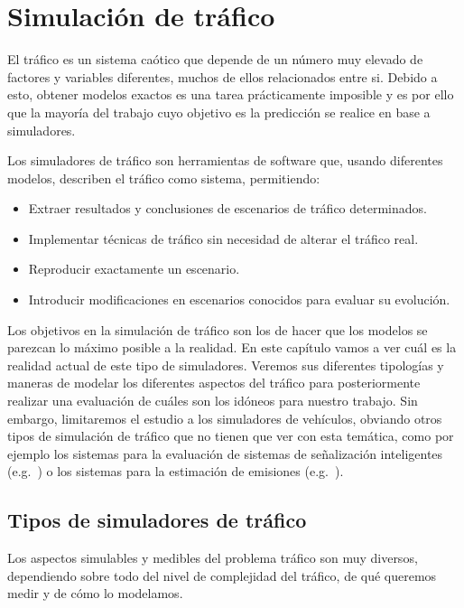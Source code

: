 \chapter{Simulación de tráfico}
\label{ch:sota-traffic-simulation}

El tráfico es un sistema caótico que depende de un número muy elevado de factores y variables diferentes, muchos de ellos relacionados entre si. Debido a esto, obtener modelos exactos es una tarea prácticamente imposible y es por ello que la mayoría del trabajo cuyo objetivo es la predicción se realice en base a simuladores.

Los simuladores de tráfico son herramientas de software que, usando diferentes modelos, describen el tráfico como sistema, permitiendo:

\begin{itemize}
	\item Extraer resultados y conclusiones de escenarios de tráfico determinados.
	\item Implementar técnicas de tráfico sin necesidad de alterar el tráfico real.
	\item Reproducir exactamente un escenario.
	\item Introducir modificaciones en escenarios conocidos para evaluar su evolución.
\end{itemize}

Los objetivos en la simulación de tráfico son los de hacer que los modelos se parezcan lo máximo posible a la realidad. En este capítulo vamos a ver cuál es la realidad actual de este tipo de simuladores. Veremos sus diferentes tipologías y maneras de modelar los diferentes aspectos del tráfico para posteriormente realizar una evaluación de cuáles son los idóneos para nuestro trabajo. Sin embargo, limitaremos el estudio a los simuladores de vehículos, obviando otros tipos de simulación de tráfico que no tienen que ver con esta temática, como por ejemplo los sistemas para la evaluación de sistemas de señalización inteligentes (e.g.~\cite{jin2016evaluation}) o los sistemas para la estimación de emisiones (e.g.~\cite{quaassdorff2016microscale}).

\section{Tipos de simuladores de tráfico}

Los aspectos simulables y medibles del problema tráfico son muy diversos, dependiendo sobre todo del nivel de complejidad del tráfico, de qué queremos medir y de cómo lo modelamos.


